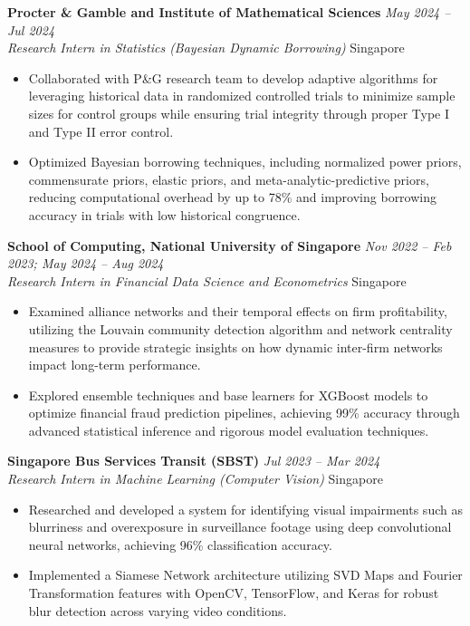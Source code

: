 \documentclass[10pt,a4paper]{article}
\newcommand{\cventry}[4]{%
\textbf{#1} \hfill \textit{#2} \\
\textit{#3} \hfill #4
\vspace{2pt}
}
\begin{document}
\vspace{4pt}

\cventry{Procter \& Gamble and Institute of Mathematical Sciences}{May 2024 -- Jul 2024}{Research Intern in Statistics (Bayesian Dynamic Borrowing)}{Singapore}
\begin{itemize}
    \item Collaborated with P\&G research team to develop adaptive algorithms for leveraging historical data in randomized controlled trials to minimize sample sizes for control groups while ensuring trial integrity through proper Type I and Type II error control.
    \item Optimized Bayesian borrowing techniques, including normalized power priors, commensurate priors, elastic priors, and meta-analytic-predictive priors, reducing computational overhead by up to 78\% and improving borrowing accuracy in trials with low historical congruence.
\end{itemize}

\vspace{4pt}

\cventry{School of Computing, National University of Singapore}{Nov 2022 -- Feb 2023; May 2024 -- Aug 2024}{Research Intern in Financial Data Science and Econometrics}{Singapore}
\begin{itemize}
    \item Examined alliance networks and their temporal effects on firm profitability, utilizing the Louvain community detection algorithm and network centrality measures to provide strategic insights on how dynamic inter-firm networks impact long-term performance.
    \item Explored ensemble techniques and base learners for XGBoost models to optimize financial fraud prediction pipelines, achieving 99\% accuracy through advanced statistical inference and rigorous model evaluation techniques.
\end{itemize}

\vspace{4pt}

\cventry{Singapore Bus Services Transit (SBST)}{Jul 2023 -- Mar 2024}{Research Intern in Machine Learning (Computer Vision)}{Singapore}
\begin{itemize}
    \item Researched and developed a system for identifying visual impairments such as blurriness and overexposure in surveillance footage using deep convolutional neural networks, achieving 96\% classification accuracy.
    \item Implemented a Siamese Network architecture utilizing SVD Maps and Fourier Transformation features with OpenCV, TensorFlow, and Keras for robust blur detection across varying video conditions.
\end{itemize}
\end{document}
